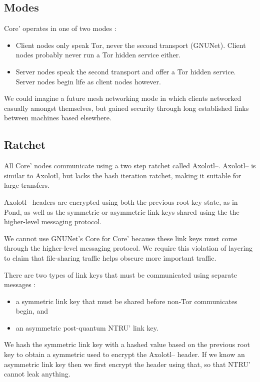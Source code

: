 \subsection{Modes}

Core' operates in one of two modes : 
\begin{itemize}
\item Client nodes only speak Tor, never the second transport (GNUNet).
Client nodes probably never run a Tor hidden service either.
\item Server nodes speak the second transport and offer a Tor hidden
service.  Server nodes begin life as client nodes however.
\end{itemize}

We could imagine a future mesh networking mode in which clients
networked casually amongst themselves, but gained security through long
established links between machines based elsewhere.

\subsection{Ratchet}

All Core' nodes communicate using a two step ratchet called Axolotl--.
Axolotl-- is similar to Axolotl, but lacks the hash iteration ratchet,
making it suitable for large transfers.  

Axolotl-- headers are encrypted using both the previous root key state,
as in Pond, as well as the symmetric or asymmetric link keys shared
using the the higher-level messaging protocol.  

We cannot use GNUNet's Core for Core' because these link keys must come
through the higher-level messaging protocol.  We require this violation
of layering to claim that file-sharing traffic helps obscure more
important traffic.

There are two types of link keys that must be communicated using
separate messages : 
\begin{itemize}
\item a symmetric link key that must be shared before non-Tor
communicates begin, and 
\item an asymmetric post-quantum NTRU' link key.
\end{itemize}

We hash the symmetric link key with a hashed value based on the previous
root key to obtain a symmetric used to encrypt the Axolotl-- header.  If
we know an asymmetric link key then we first encrypt the header using
that, so that NTRU' cannot leak anything.

